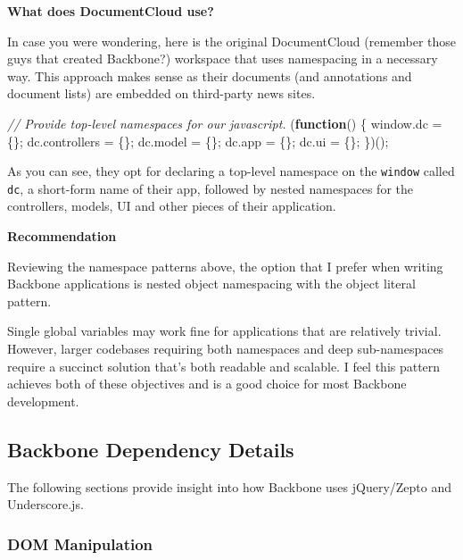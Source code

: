 \documentclass[9pt]{book}
\newenvironment{Shaded}{}{}
\newcommand{\KeywordTok}[1]{\textcolor[rgb]{0.00,0.44,0.13}{\textbf{{#1}}}}
\newcommand{\CommentTok}[1]{\textcolor[rgb]{0.38,0.63,0.69}{\textit{{#1}}}}
\newcommand{\OtherTok}[1]{\textcolor[rgb]{0.00,0.44,0.13}{{#1}}}
\newcommand{\FunctionTok}[1]{\textcolor[rgb]{0.02,0.16,0.49}{{#1}}}
\newcommand{\NormalTok}[1]{{#1}}
\begin{document}
\textbf{What does DocumentCloud use?}

In case you were wondering, here is the original DocumentCloud (remember
those guys that created Backbone?) workspace that uses namespacing in a
necessary way. This approach makes sense as their documents (and
annotations and document lists) are embedded on third-party news sites.

\begin{Shaded}
\begin{Highlighting}[]

\CommentTok{// Provide top-level namespaces for our javascript.}
\NormalTok{(}\KeywordTok{function}\NormalTok{() \{}
  \OtherTok{window}\NormalTok{.}\FunctionTok{dc} \NormalTok{= \{\};}
  \OtherTok{dc}\NormalTok{.}\FunctionTok{controllers} \NormalTok{= \{\};}
  \OtherTok{dc}\NormalTok{.}\FunctionTok{model} \NormalTok{= \{\};}
  \OtherTok{dc}\NormalTok{.}\FunctionTok{app} \NormalTok{= \{\};}
  \OtherTok{dc}\NormalTok{.}\FunctionTok{ui} \NormalTok{= \{\};}
\NormalTok{\})();}
\end{Highlighting}
\end{Shaded}

As you can see, they opt for declaring a top-level namespace on the
\texttt{window} called \texttt{dc}, a short-form name of their app,
followed by nested namespaces for the controllers, models, UI and other
pieces of their application.

\textbf{Recommendation}

Reviewing the namespace patterns above, the option that I prefer when
writing Backbone applications is nested object namespacing with the
object literal pattern.

Single global variables may work fine for applications that are
relatively trivial. However, larger codebases requiring both namespaces
and deep sub-namespaces require a succinct solution that's both readable
and scalable. I feel this pattern achieves both of these objectives and
is a good choice for most Backbone development.

\subsection{Backbone Dependency
Details}\label{backbone-dependency-details}

The following sections provide insight into how Backbone uses
jQuery/Zepto and Underscore.js.

\subsubsection{DOM Manipulation}\label{dom-manipulation}
\end{document}
